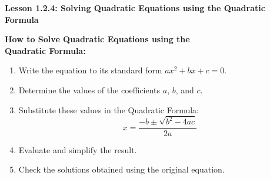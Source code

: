 \begin{center}
\textbf{Lesson 1.2.4: Solving Quadratic Equations using the Quadratic Formula}
\end{center}

\vspace*{1ex}

\textbf{How to Solve Quadratic Equations using the\\Quadratic Formula:}
\begin{enumerate}[label = \color{blue}\arabic*. ]
   \item Write the equation to its standard form $ax^2 + bx + c = 0$.
   \item Determine the values of the coefficients $a$, $b$, and $c$.
   \item Substitute these values in the Quadratic Formula: $$x=\dfrac{-b\pm \sqrt{b^2-4ac}}{2a}$$ 
   \item Evaluate and simplify the result.
   \item Check the solutions obtained using the original equation.
\end{enumerate}
		 
